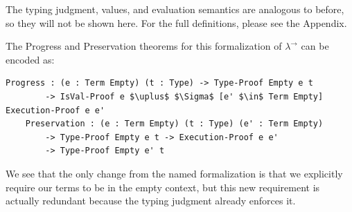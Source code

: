 \documentclass[12pt, letterpaper]{article}
\begin{document}
The typing judgment, values, and evaluation semantics are analogous to before, so they will not be shown here. For the full definitions, please see the Appendix.

The Progress and Preservation theorems for this formalization of $\lambda^{\to}$ can be encoded as:
\begin{Verbatim}[mathescape,commandchars=\\\{\}]
	Progress : (e : Term Empty) (t : Type) -> Type-Proof Empty e t 
		-> IsVal-Proof e $\uplus$ $\Sigma$ [e' $\in$ Term Empty] Execution-Proof e e'
	Preservation : (e : Term Empty) (t : Type) (e' : Term Empty) 
		-> Type-Proof Empty e t -> Execution-Proof e e' 
		-> Type-Proof Empty e' t
\end{Verbatim}
We see that the only change from the named formalization is that we explicitly require our terms to be in the empty context, but this new requirement is actually redundant because the typing judgment already enforces it.
\end{document}

